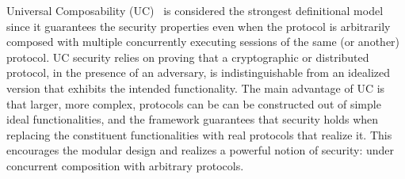 Universal Composability (UC)~\cite{canettiUC} %
is considered the strongest definitional model since it guarantees the security properties even when the protocol is arbitrarily composed with
multiple concurrently executing sessions of the same (or another) protocol.
UC security relies on proving that a cryptographic or distributed protocol, in the presence of an adversary, is indistinguishable from an idealized version that exhibits the intended functionality.
The main advantage of UC is that larger, more complex, protocols can be can be constructed out of simple ideal functionalities, and the framework guarantees that security holds when 
replacing the constituent functionalities with real protocols that realize it.
This encourages the modular design and realizes a powerful notion of security: under concurrent composition with arbitrary protocols.



